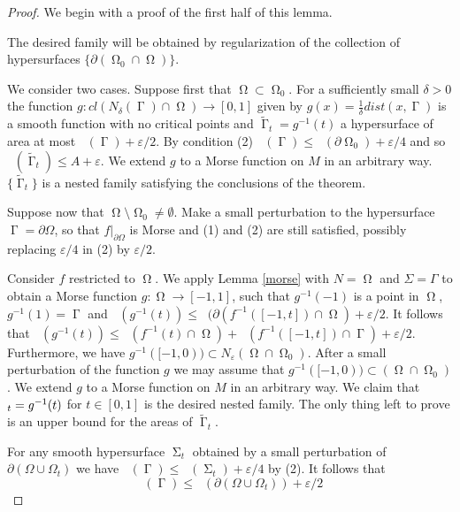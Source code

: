 \documentclass[12pt]{amsart}
\DeclareMathOperator{\Hn}{\mathcal{H}^n}
\DeclareMathOperator{\G}{\Gamma}
\DeclareMathOperator{\Om}{\Omega}
\DeclareMathOperator{\Si}{\Sigma}
\theoremstyle{definition}
\begin{document}
\begin{proof}
    We begin with a proof of the first half of this lemma.
    
    The desired family will be obtained 
    by regularization of the collection of hypersurfaces
    $\{ \partial (\Om_0 \cap \Om) \}$.
    
    We consider two cases. 
    Suppose first that $\Om \subset \Om_0$.
    For a sufficiently small $\delta>0$
    the function $g: cl(N_\delta(\G) \cap \Om) \rightarrow [0,1]$
    given by $g(x)= \frac{1}{\delta} dist(x, \G)$ is a smooth function
    with no critical points and $\tilde{\G}_t = g^{-1}(t)$ a hypersurface
    of area at most $\Hn(\G) + \varepsilon/2$. By condition (2)
    $\Hn(\G) \leq \Hn(\partial \Om_0) + \varepsilon/4$ and so
    $\Hn(\tilde{\G}_t) \leq A + \varepsilon$.
    We extend $g$ to a Morse function on $M$ in an arbitrary way.
    $\{ \tilde{\G}_t \}$ is a nested family satisfying the conclusions of the
    theorem.
    
    Suppose now that $\Om  \setminus \Om_0  \neq \emptyset$.
    Make a small perturbation to the hypersurface $\G = \partial \Omega$, so that
    $f|_{\partial \Omega}$ is Morse and (1) and (2) are still satisfied,
    possibly replacing $\varepsilon/4$ in (2) by $ \varepsilon/2$.
    
    Consider $f$ restricted to $\Om$.
    We apply Lemma \ref*{morse}
    with $N= \Om $ and $\Sigma = \Gamma$ to obtain
    a Morse function $g: \Om \rightarrow [-1,1]$, such that
    $g^{-1}(-1)$ is a point in $\Om$,
    $g^{-1}(1) = \G$ and  $\Hn(g^{-1}(t)) \leq \Hn(\partial (f^{-1}([-1,t])
    \cap \Om) + \varepsilon/2$.
    It follows that 
    $\Hn(g^{-1}(t)) \leq \Hn(f^{-1}(t) \cap \Om) + \Hn(f^{-1}([-1,t])\cap \G) + \varepsilon/2$.
    Furthermore, we have $g^{-1}([-1,0)) \subset N_{\varepsilon} (\Om \cap \Om_0)$.
    After a small perturbation of the function $g$ we may assume that
    $g^{-1}([-1,0)) \subset (\Om \cap \Om_0)$.
    We extend $g$ to a Morse function on $M$ in an arbitrary way.
    We claim that $\title{\G}_t = g^{-1}(t)$ for $t\in [0,1]$
    is the desired nested family. The only thing left to prove
    is an upper bound for the areas of $\tilde{\G}_t$.
    
    For any smooth hypersurface $\Si_t$ obtained 
    by a small perturbation of $\partial (\Omega \cup \Omega_t)$
    we have $\Hn(\G) \leq \Hn(\Si_t) + \varepsilon/4$ by (2).
    It follows that 
    $$\Hn(\G) \leq \Hn(\partial (\Omega \cup \Omega_t)) + \varepsilon/2$$
    

\end{proof}
\end{document}
